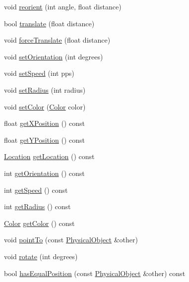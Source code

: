 \begin{DoxyCompactItemize}
\item 
void \hyperlink{classPhysicalObject_a6e580010f7b025beacdee13835c8a726}{reorient} (int angle, float distance)
\item 
bool \hyperlink{classPhysicalObject_a2246c1f65d47638f61c2996d477efc6f}{translate} (float distance)
\item 
void \hyperlink{classPhysicalObject_a7121bd6642a98adc38e8c3348c4a3e01}{force\-Translate} (float distance)
\item 
void \hyperlink{classPhysicalObject_ac78eb70d7b7d24a586e5eed347f3a8d2}{set\-Orientation} (int degrees)
\item 
void \hyperlink{classPhysicalObject_ae197cc719763a64d34fc9723458aab01}{set\-Speed} (int pps)
\item 
void \hyperlink{classPhysicalObject_a81be6f4317d6813ab0b73ccf00da181a}{set\-Radius} (int radius)
\item 
void \hyperlink{classPhysicalObject_a2f5bff48537b44f6f1abd4500c644bc8}{set\-Color} (\hyperlink{structColor}{Color} color)
\item 
float \hyperlink{classPhysicalObject_a37bacbedf0b90865403149a1396ee58f}{get\-X\-Position} () const 
\item 
float \hyperlink{classPhysicalObject_a95b02cbe019cc2f968eb482487b5db7e}{get\-Y\-Position} () const 
\item 
\hyperlink{structLocation}{Location} \hyperlink{classPhysicalObject_a92b2b2addc7f85396c19fc255393e558}{get\-Location} () const 
\item 
int \hyperlink{classPhysicalObject_ac6d9bb140bcf0e492a0792e3eadbb3a8}{get\-Orientation} () const 
\item 
int \hyperlink{classPhysicalObject_a1f687df65cf05bed55a43edfda87790d}{get\-Speed} () const 
\item 
int \hyperlink{classPhysicalObject_a311d08aaa4bc7c863d0349397b187e6c}{get\-Radius} () const 
\item 
\hyperlink{structColor}{Color} \hyperlink{classPhysicalObject_aad8e15d2bec5e7c4fd38c2a8335dc0a0}{get\-Color} () const 
\item 
void \hyperlink{classPhysicalObject_aa4e04a3becfa1be5b3fea856a2f0c3fb}{point\-To} (const \hyperlink{classPhysicalObject}{Physical\-Object} \&other)
\item 
void \hyperlink{classPhysicalObject_abb08525b7fa5fa7f3b936847c28bb630}{rotate} (int degrees)
\item 
bool \hyperlink{classPhysicalObject_a2bfa9e53acb308cdbfdda0945a8b1fe3}{has\-Equal\-Position} (const \hyperlink{classPhysicalObject}{Physical\-Object} \&other) const 

\end{DoxyCompactItemize}

